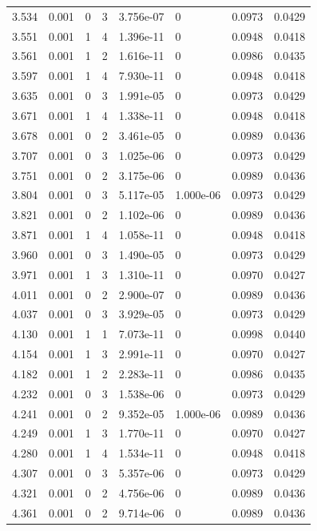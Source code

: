 \documentclass[preview]{standalone}
\begin{document}
{{{\begin{tabular}{L{1.2cm}C{1.2cm} C{0.3cm}C{0.5cm} C{1.4cm}C{1.4cm} C{1.4cm}C{1.4cm}}
  3.534  &  0.001  & 0     &  3 &  3.756e-07  & 0  & 0.0973 &  0.0429   \\ 
  3.551  &  0.001  & 1     &  4 &  1.396e-11  & 0  & 0.0948 &  0.0418   \\ 
  3.561  &  0.001  & 1     &  2 &  1.616e-11  & 0  & 0.0986 &  0.0435   \\ 
  3.597  &  0.001  & 1     &  4 &  7.930e-11  & 0  & 0.0948 &  0.0418   \\ 
  3.635  &  0.001  & 0     &  3 &  1.991e-05  & 0  & 0.0973 &  0.0429   \\ 
  3.671  &  0.001  & 1     &  4 &  1.338e-11  & 0  & 0.0948 &  0.0418   \\ 
  3.678  &  0.001  & 0     &  2 &  3.461e-05  & 0  & 0.0989 &  0.0436   \\ 
  3.707  &  0.001  & 0     &  3 &  1.025e-06  & 0  & 0.0973 &  0.0429   \\ 
  3.751  &  0.001  & 0     &  2 &  3.175e-06  & 0  & 0.0989 &  0.0436   \\ 
  3.804  &  0.001  & 0     &  3 &  5.117e-05  & 1.000e-06  & 0.0973 &  0.0429   \\ 
  3.821  &  0.001  & 0     &  2 &  1.102e-06  & 0  & 0.0989 &  0.0436   \\ 
  3.871  &  0.001  & 1     &  4 &  1.058e-11  & 0  & 0.0948 &  0.0418   \\ 
  3.960  &  0.001  & 0     &  3 &  1.490e-05  & 0  & 0.0973 &  0.0429   \\ 
  3.971  &  0.001  & 1     &  3 &  1.310e-11  & 0  & 0.0970 &  0.0427   \\ 
  4.011  &  0.001  & 0     &  2 &  2.900e-07  & 0  & 0.0989 &  0.0436   \\ 
  4.037  &  0.001  & 0     &  3 &  3.929e-05  & 0  & 0.0973 &  0.0429   \\ 
  4.130  &  0.001  & 1     &  1 &  7.073e-11  & 0  & 0.0998 &  0.0440   \\ 
  4.154  &  0.001  & 1     &  3 &  2.991e-11  & 0  & 0.0970 &  0.0427   \\ 
  4.182  &  0.001  & 1     &  2 &  2.283e-11  & 0  & 0.0986 &  0.0435   \\ 
  4.232  &  0.001  & 0     &  3 &  1.538e-06  & 0  & 0.0973 &  0.0429   \\ 
  4.241  &  0.001  & 0     &  2 &  9.352e-05  & 1.000e-06  & 0.0989 &  0.0436   \\ 
  4.249  &  0.001  & 1     &  3 &  1.770e-11  & 0  & 0.0970 &  0.0427   \\ 
  4.280  &  0.001  & 1     &  4 &  1.534e-11  & 0  & 0.0948 &  0.0418   \\ 
  4.307  &  0.001  & 0     &  3 &  5.357e-06  & 0  & 0.0973 &  0.0429   \\ 
  4.321  &  0.001  & 0     &  2 &  4.756e-06  & 0  & 0.0989 &  0.0436   \\ 
  4.361  &  0.001  & 0     &  2 &  9.714e-06  & 0  & 0.0989 &  0.0436   \\ 
\hline 
\end{tabular} 

}}}
\end{document}
